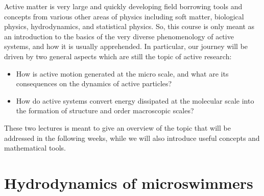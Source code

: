 Active matter is very large and quickly developing field borrowing tools and concepts from various other areas of physics including soft matter, biological physics, hydrodynamics, and statistical physics. So, this course is only meant as an introduction to the basics of the very diverse phenomenology of active systems, and how it is usually apprehended. In particular, our journey will be driven by two general aspects which are still the topic of active research:
\begin{itemize}
    \item How is active motion generated at the micro scale, and what are its consequences on the dynamics of active particles?
    \item How do active systems convert energy dissipated at the molecular scale into the formation of structure and order macroscopic scales?
\end{itemize}
These two lectures is meant to give an overview of the topic that will be addressed in the following weeks, while we will also introduce useful concepts and mathematical tools.




\section{Hydrodynamics of microswimmers}

